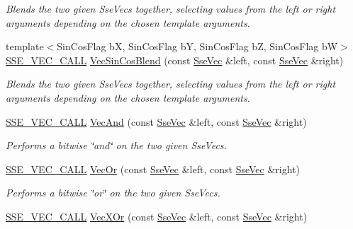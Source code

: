 \begin{DoxyCompactItemize}
\begin{DoxyCompactList}\small\item\em Blends the two given Sse\+Vecs together, selecting values from the left or right arguments depending on the chosen template arguments. \end{DoxyCompactList}\item 
{\footnotesize template$<$Sin\+Cos\+Flag b\+X, Sin\+Cos\+Flag b\+Y, Sin\+Cos\+Flag b\+Z, Sin\+Cos\+Flag b\+W$>$ }\\\hyperlink{ssevec__math__defs_8h_a97454f977a5281455cecacce1e8ba670}{S\+S\+E\+\_\+\+V\+E\+C\+\_\+\+C\+A\+L\+L} \hyperlink{group___s_i_m_d_vec_math_ga7b0224a324592a5fc96f9558bd8d4697}{Vec\+Sin\+Cos\+Blend} (const \hyperlink{namespacegofxmath_a634570ddcd2496053ee966227080e02f}{Sse\+Vec} \&left, const \hyperlink{namespacegofxmath_a634570ddcd2496053ee966227080e02f}{Sse\+Vec} \&right)
\begin{DoxyCompactList}\small\item\em Blends the two given Sse\+Vecs together, selecting values from the left or right arguments depending on the chosen template arguments. \end{DoxyCompactList}\item 
\hyperlink{ssevec__math__defs_8h_a97454f977a5281455cecacce1e8ba670}{S\+S\+E\+\_\+\+V\+E\+C\+\_\+\+C\+A\+L\+L} \hyperlink{group___s_i_m_d_vec_math_ga79078e17e228025b5a974f11aa5fbb74}{Vec\+And} (const \hyperlink{namespacegofxmath_a634570ddcd2496053ee966227080e02f}{Sse\+Vec} \&left, const \hyperlink{namespacegofxmath_a634570ddcd2496053ee966227080e02f}{Sse\+Vec} \&right)
\begin{DoxyCompactList}\small\item\em Performs a bitwise \char`\"{}and\char`\"{} on the two given Sse\+Vecs. \end{DoxyCompactList}\item 
\hyperlink{ssevec__math__defs_8h_a97454f977a5281455cecacce1e8ba670}{S\+S\+E\+\_\+\+V\+E\+C\+\_\+\+C\+A\+L\+L} \hyperlink{group___s_i_m_d_vec_math_gad38069a17733d63e5a17bbe45d792ea5}{Vec\+Or} (const \hyperlink{namespacegofxmath_a634570ddcd2496053ee966227080e02f}{Sse\+Vec} \&left, const \hyperlink{namespacegofxmath_a634570ddcd2496053ee966227080e02f}{Sse\+Vec} \&right)
\begin{DoxyCompactList}\small\item\em Performs a bitwise \char`\"{}or\char`\"{} on the two given Sse\+Vecs. \end{DoxyCompactList}\item 
\hyperlink{ssevec__math__defs_8h_a97454f977a5281455cecacce1e8ba670}{S\+S\+E\+\_\+\+V\+E\+C\+\_\+\+C\+A\+L\+L} \hyperlink{group___s_i_m_d_vec_math_gaf0e068289862b8f6cd6c3371798cba01}{Vec\+X\+Or} (const \hyperlink{namespacegofxmath_a634570ddcd2496053ee966227080e02f}{Sse\+Vec} \&left, const \hyperlink{namespacegofxmath_a634570ddcd2496053ee966227080e02f}{Sse\+Vec} \&right)

\end{DoxyCompactItemize}
